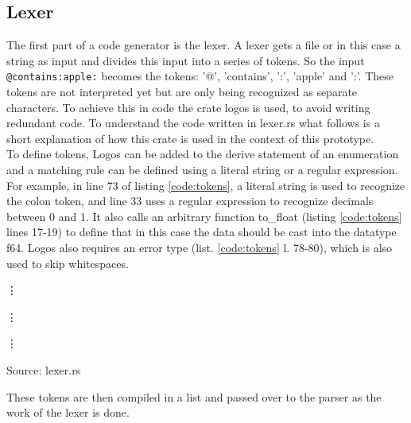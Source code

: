 \subsection{Lexer}
The first part of a code generator is the lexer. A lexer gets a file or in this case a string as input and divides this input into a series of tokens. So the input \lstinline[language=Fulltext-Search]$@contains:apple:$ becomes the tokens: '@', 'contains', ':', 'apple' and ':'. These tokens are not interpreted yet but are only being recognized as separate characters. To achieve this in code the crate logos is used, to avoid writing redundant code. To understand the code written in lexer.rs what follows is a short explanation of how this crate is used in the context of this prototype.\\
To define tokens, Logos can be added to the derive statement of an enumeration and a matching rule can be defined using a literal string or a regular expression. For example, in line 73 of listing \ref{code:tokens}, a literal string is used to recognize the colon token, and line 33 uses a regular expression to recognize decimals between 0 and 1. It also calls an arbitrary function to\_float (listing \ref{code:tokens} lines 17-19) to define that in this case the data should be cast into the datatype f64. Logos also requires an error type (list. \ref{code:tokens} l. 78-80), which is also used to skip whitespaces. \parencite[cf.][n.p.]{hirsz_logos_2022}
\begin{codeenv}
    \label{code:tokens}
    
    \vdots
    
    \vdots
    
    \vdots
    
    \centerline{Source: lexer.rs}
\end{codeenv}
These tokens are then compiled in a list and passed over to the parser as the work of the lexer is done.
